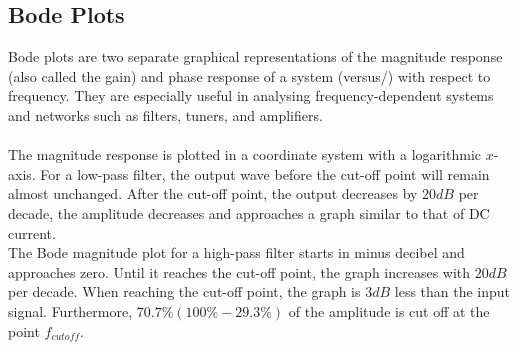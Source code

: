 \subsection{Bode Plots} \label{sub:bode}
Bode plots are two separate graphical representations of the magnitude response (also called the gain) and phase response of a system (versus/) with respect to frequency. They are especially useful in analysing frequency-dependent systems and networks such as filters, tuners, and amplifiers. \cite [p. 626]{bcircuit5}  \\
\\
The magnitude response is plotted in a coordinate system with a logarithmic $x$-axis. For a low-pass filter, the output wave before the cut-off point will remain almost unchanged. After the cut-off point, the output decreases by $20 dB$ per decade, the amplitude decreases and approaches a graph similar to that of DC current. \\
The Bode magnitude plot for a high-pass filter starts in minus decibel and approaches zero. Until it reaches the cut-off point, the graph increases with $20 dB$ per decade. When reaching the cut-off point, the graph is $3 dB$ less than the input signal. Furthermore, $70.7\% (100\%-29.3\%)$ of the amplitude is cut off at the point $f_{cutoff}$.

